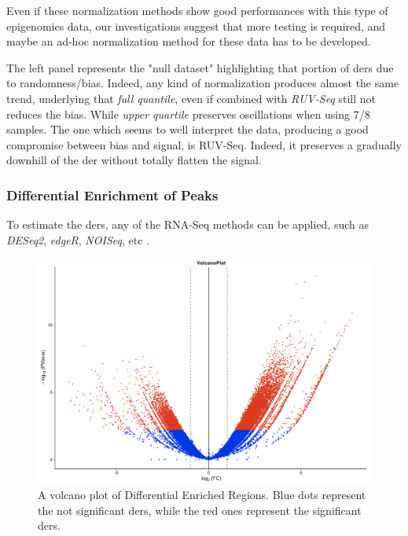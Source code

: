 Even if these normalization methods show good performances with this type of epigenomics data, our investigations suggest that more testing is required, and maybe an ad-hoc normalization method for these data has to be developed.

The left panel represents the "null dataset" highlighting that portion of \glspl{der} due to randomness/bias. Indeed, any kind of normalization produces almost the same trend, underlying that \textit{full quantile}, even if combined with \textit{RUV-Seq} still not reduces the bias.
While \textit{upper quartile} preserves oscillations when using 7/8 samples.
The one which seems to well interpret the data, producing a good compromise between bias and signal, is RUV-Seq.
Indeed, it preserves a gradually downhill of the \gls{der} without totally flatten the signal.

\subsubsection{Differential Enrichment of Peaks}

To estimate the \glspl{der}, any of the RNA-Seq methods can be applied, such as \textit{DESeq2}, \textit{edgeR}, \textit{NOISeq}, etc \cite{Robinson2009, McCarthy2012, Tarazona2012}.

\begin{figure}[H]
\centering
\includegraphics[width=\textwidth, keepaspectratio]{img/descan2/DE_peaks.png}
\caption[Differential Enrichment Regions Volcano]{A volcano plot of Differential Enriched Regions. Blue dots represent the not significant \glspl{der}, while the red ones represent the significant \glspl{der}.}
\label{fig:depeaksdescan}
\centering
\end{figure}

